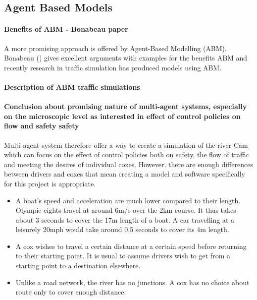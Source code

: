     \subsection{Agent Based Models}
    \paragraph{Benefits of ABM - Bonabeau paper}
      A more promising approach is offered by Agent-Based Modelling (ABM). Bonabeau (\cite{Bonabeau2002}) gives excellent arguments with examples for the benefits ABM and recently research in traffic simulation has produced models using ABM.
      
      \paragraph{Description of ABM traffic simulations}

          
    \paragraph{Conclusion about promising nature of multi-agent systems, especially on the  microscopic level as interested in effect of control policies on flow and safety safety}
    Multi-agent system therefore offer a way to create a simulation of the river Cam which can focus on the effect of control policies both on safety, the flow of traffic and meeting the desires of individual coxes. However, there are enough differences between drivers and coxes that mean creating a model and software specifically for this project is appropriate.
    
      \begin{itemize}
        \item A boat's speed and acceleration are much lower compared to their length. Olympic eights travel at around 6m/s over the 2km course. It thus takes about 3 seconds to cover the 17m length of a boat. A car travelling at a leisurely 20mph would take around 0.5 seconds to cover its 4m length.
        
        \item A cox wishes to travel a certain distance at a certain speed before returning to their starting point. It is usual to assume drivers wish to get from a starting point to a destination elsewhere. 
        
        \item Unlike a road network, the river has no junctions. A cox has no choice about route only to cover enough distance.
      \end{itemize}
  
